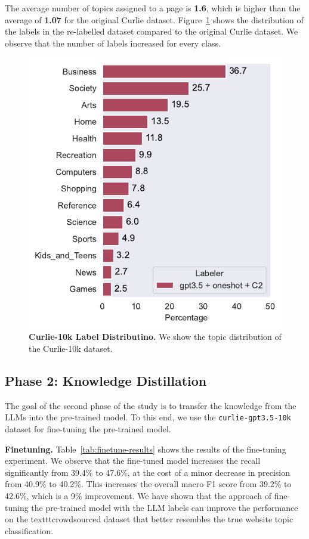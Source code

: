 The average number of topics assigned to a page is \textbf{1.6}, which is higher than the average of \textbf{1.07} for the original Curlie dataset. Figure~\ref{fig:label-distribution-comparison} shows the distribution of the labels in the re-labelled dataset compared to the original Curlie dataset. We observe that the number of labels increased for every class.

\begin{figure}[!h]
    \centering
    \includegraphics[width=.8\columnwidth]{figures/curlie-10k-dist.pdf}
    \caption{\textbf{Curlie-10k Label Distributino.} We show the topic distribution of the Curlie-10k dataset.}
    \label{fig:label-distribution-comparison}
\end{figure}


\subsection*{Phase 2: Knowledge Distillation}


The goal of the second phase of the study is to transfer the knowledge from the LLMs into the pre-trained model. 
To this end, we use the \texttt{curlie-gpt3.5-10k} dataset for fine-tuning the pre-trained model.

\textbf{Finetuning.} Table~\ref{tab:finetune-results} shows the results of the fine-tuning experiment. 
We observe that the fine-tuned model increases the recall significantly from 39.4\% to 47.6\%, at the cost of a minor decrease in precision from 40.9\% to 40.2\%. 
This increases the overall macro F1 score from 39.2\% to 42.6\%, which is a 9\% improvement. 
We have shown that the approach of fine-tuning the pre-trained model with the LLM labels can improve the performance on the texttt{crowdsourced} dataset that better resembles the true website topic classification.

